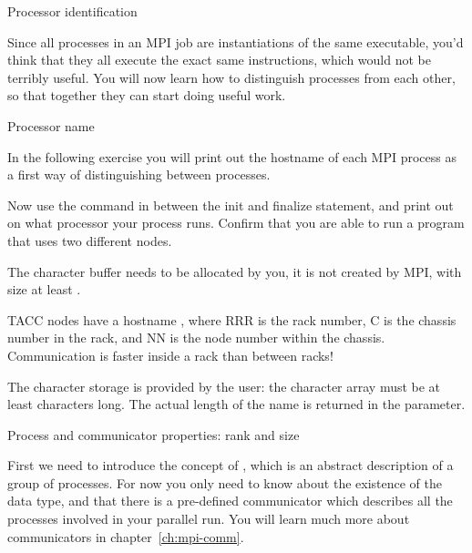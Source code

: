 
 {Processor identification}
\label{sec:rank-size}

Since all processes in an MPI job are instantiations of the same executable,
you'd think that they all execute the exact same instructions,
which would not be terribly useful.
You will now learn how to distinguish
processes from each other, so that together they can start doing
useful work.

 {Processor name}

In the following exercise you will print out the hostname
of each MPI process as a first way of distinguishing between processes.

\begin{exercise}
  \label{ex:procname}
  Now use the command 
  in between the
  init and finalize statement, and print out on what processor your process runs.
  Confirm that you are able to run a program that uses two different nodes.

  The character buffer needs to be allocated by you, it is not
  created by MPI, with size at
  least .

\begin{tacc}
    TACC nodes have a hostname , where RRR is the rack number, C is the chassis
    number in the rack, and NN is the node number within the chassis. Communication
    is faster inside a rack than between racks!
\end{tacc}
\end{exercise}

%
The character storage is provided by the user:
the character array must be at least  characters long.
The actual length of the name is returned in the  parameter.

 {Process and communicator properties: rank and size}

First we need to introduce the concept of
, which is an abstract description of a
group of processes. For now you only need to know about the existence
of the  data type, and that there is a
pre-defined communicator  which
describes all the processes involved in your parallel run. You will
learn much more about communicators in chapter~\ref{ch:mpi-comm}.

